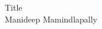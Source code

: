 \documentclass[11pt, a4paper]{article}
\begin{document}
\onehalfspacing


\begin{center}
{\LARGE Title}\\
{Manideep Mamindlapally}\\
\end{center}
\vspace{1em}





% 
% 
\end{document}
